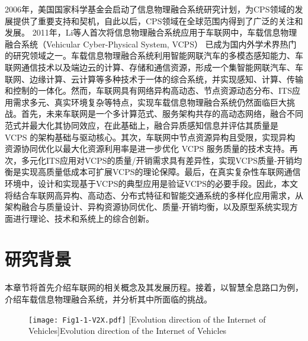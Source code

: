 2006年，美国国家科学基金会启动了信息物理融合系统研究计划\cite{nfs2006cps}，为CPS领域的发展提供了重要支持和契机，自此以后，CPS领域在全球范围内得到了广泛的关注和发展\cite{lee2016introduction}。
2011年，Li等人\cite{li2011human}首次将信息物理融合系统应用于车联网中，车载信息物理融合系统（Vehicular Cyber-Physical System, VCPS）\cite{xia2019zi} 已成为国内外学术界热门的研究领域之一。车载信息物理融合系统利用智能网联汽车的多模态感知能力、车联网通信技术以及端边云的计算、存储和通信资源，形成一个集智能网联汽车、车联网、边缘计算、云计算等多种技术于一体的综合系统，并实现感知、计算、传输和控制的一体化。然而，车联网具有网络异构高动态、节点资源动态分布、ITS应用需求多元、真实环境复杂等特点，实现车载信息物理融合系统仍然面临巨大挑战。首先，未来车联网是一个多计算范式、服务架构共存的高动态网络，融合不同范式并最大化其协同效应，在此基础上，融合异质感知信息并评估其质量是 VCPS 的架构基础与驱动核心。其次，车联网中节点资源异构且受限，实现异构资源协同优化以最大化资源利用率是进一步优化 VCPS 服务质量的技术支持。再次，多元化ITS应用对VCPS的质量/开销需求具有差异性，实现VCPS质量-开销均衡是实现高质量低成本可扩展VCPS的理论保障。最后，在真实复杂性车联网通信环境中，设计和实现基于VCPS的典型应用是验证VCPS的必要手段。因此，本文将结合车联网高异构、高动态、分布式特征和智能交通系统的多样化应用需求，从架构融合与质量设计、异构资源协同优化、质量-开销均衡，以及原型系统实现方面进行理论、技术和系统上的综合创新。

\section{研究背景}\label{section 1-2}

本章节将首先介绍车联网的相关概念及其发展历程。接着，以智慧全息路口为例，介绍车载信息物理融合系统，并分析其中所面临的挑战。

\begin{figure}[h]
	\centering
\texttt{[image: Fig1-1-V2X.pdf]}
	[Evolution direction of the Internet of Vehicles]{Evolution direction of the Internet of Vehicles}
	\label{fig 1-1}
\end{figure}

